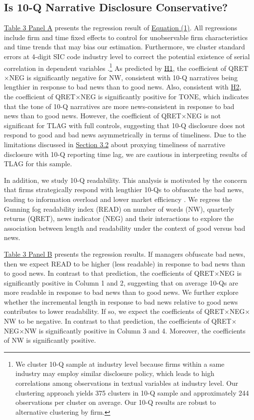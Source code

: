 \documentclass[letterpaper,12pt]{article}
\begin{document}
\begin{spacing}{1.5}
\subsection{Is 10-Q Narrative Disclosure Conservative?}
\noindent \hyperref[T3PA]{Table 3 Panel A} presents the regression result of \hyperref[eq1]{Equation (1)}. All regressions include firm and time fixed effects to control for unobservable firm characteristics and time trends that may bias our estimation. Furthermore, we cluster standard errors at 4-digit SIC code industry level to correct the potential existence of serial correlation in dependent variables \cite{petersenEstimatingStandardErrors2009}.\footnote{We cluster 10-Q sample at industry level because firms within a same industry may employ similar disclosure policy, which leads to high correlations among observations in textual variables at industry level. Our clustering approach yields 375 clusters in 10-Q sample and approximately 244 observations per cluster on average. Our 10-Q results are robust to alternative clustering by firm. } As predicted by \hyperref[h1]{H1}, the coefficient of QRET$\times$NEG is significantly negative for NW, consistent with 10-Q narratives being lengthier in response to bad news than to good news. Also, consistent with \hyperref[h2]{H2}, the coefficient of QRET$\times$NEG is significantly positive for TONE, which indicates that the tone of 10-Q narratives are more news-consistent in response to bad news than to good news. However, the coefficient of QRET$\times$NEG is not significant for TLAG with full controls, suggesting that 10-Q disclosure does not respond to good and bad news asymmetrically in terms of timeliness. Due to the limitations discussed in \hyperref[sec3.2]{Section 3.2} about proxying timeliness of narrative disclosure with 10-Q reporting time lag, we are cautious in interpreting results of TLAG for this sample.

In addition, we study 10-Q readability. This analysis is motivated by the concern that firms strategically respond with lengthier 10-Qs to obfuscate the bad news, leading to information overload and lower market efficiency \cite{chapmanInformationOverloadDisclosure2019}. We regress the Gunning fog readability index (READ) on number of words (NW), quarterly returns (QRET), news indicator (NEG) and their interactions to explore the association between length and readability under the context of good versus bad news.

\hyperref[T3PB]{Table 3 Panel B} presents the regression results. If managers obfuscate bad news, then we expect READ to be higher (less readable) in response to bad news than to good news. In contrast to that prediction, the coefficients of QRET$\times$NEG is significantly positive in Column 1 and 2, suggesting that on average 10-Qs are more readable in response to bad news than to good news. We further explore whether the incremental length in response to bad news relative to good news contributes to lower readability. If so, we expect the coefficients of QRET$\times$NEG$\times$NW to be negative. In contrast to that prediction, the coefficients of QRET$\times$NEG$\times$NW is significantly positive in Column 3 and 4. Moreover, the coefficients of NW is significantly positive. 


\end{spacing}
\end{document}
